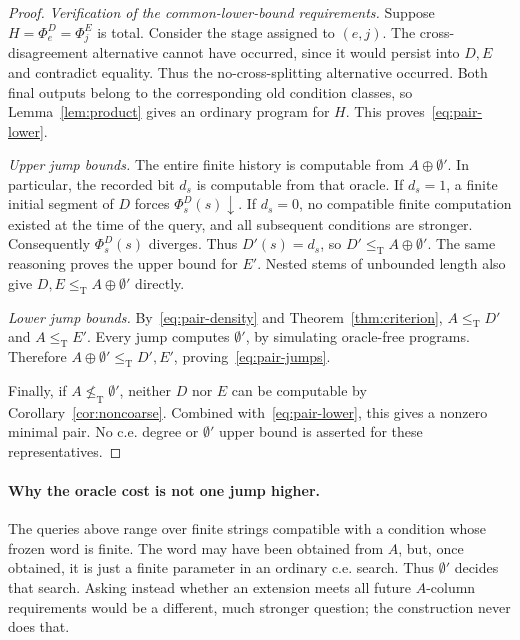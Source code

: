 \documentclass[11pt,a4paper]{article}
\newcommand{\leT}{\leq_{\mathrm T}}
\newcommand{\nleT}{\nleq_{\mathrm T}}
\theoremstyle{definition}\newtheorem{definition}[theorem]{Definition}
\theoremstyle{remark}\newtheorem{remark}[theorem]{Remark}
\begin{document}
\begin{proof}
\emph{Verification of the common-lower-bound requirements.} Suppose $H=\Phi_e^D=\Phi_j^E$ is total. Consider the stage assigned to $(e,j)$. The cross-disagreement alternative cannot have occurred, since it would persist into $D,E$ and contradict equality. Thus the no-cross-splitting alternative occurred. Both final outputs belong to the corresponding old condition classes, so Lemma~\ref{lem:product} gives an ordinary program for $H$. This proves~\eqref{eq:pair-lower}.

\emph{Upper jump bounds.} The entire finite history is computable from $A\oplus\emptyset'$. In particular, the recorded bit $d_s$ is computable from that oracle. If $d_s=1$, a finite initial segment of $D$ forces $\Phi_s^D(s)\downarrow$. If $d_s=0$, no compatible finite computation existed at the time of the query, and all subsequent conditions are stronger. Consequently $\Phi_s^D(s)$ diverges. Thus $D'(s)=d_s$, so $D'\leT A\oplus\emptyset'$. The same reasoning proves the upper bound for $E'$. Nested stems of unbounded length also give $D,E\leT A\oplus\emptyset'$ directly.

\emph{Lower jump bounds.} By~\eqref{eq:pair-density} and Theorem~\ref{thm:criterion}, $A\leT D'$ and $A\leT E'$. Every jump computes $\emptyset'$, by simulating oracle-free programs. Therefore $A\oplus\emptyset'\leT D',E'$, proving~\eqref{eq:pair-jumps}.

Finally, if $A\nleT\emptyset'$, neither $D$ nor $E$ can be computable by Corollary~\ref{cor:noncoarse}. Combined with~\eqref{eq:pair-lower}, this gives a nonzero minimal pair. No c.e. degree or $\emptyset'$ upper bound is asserted for these representatives.
\end{proof}

\paragraph{Why the oracle cost is not one jump higher.}
The queries above range over finite strings compatible with a condition whose frozen word is finite. The word may have been obtained from $A$, but, once obtained, it is just a finite parameter in an ordinary c.e. search. Thus $\emptyset'$ decides that search. Asking instead whether an extension meets all future $A$-column requirements would be a different, much stronger question; the construction never does that.
\end{document}
